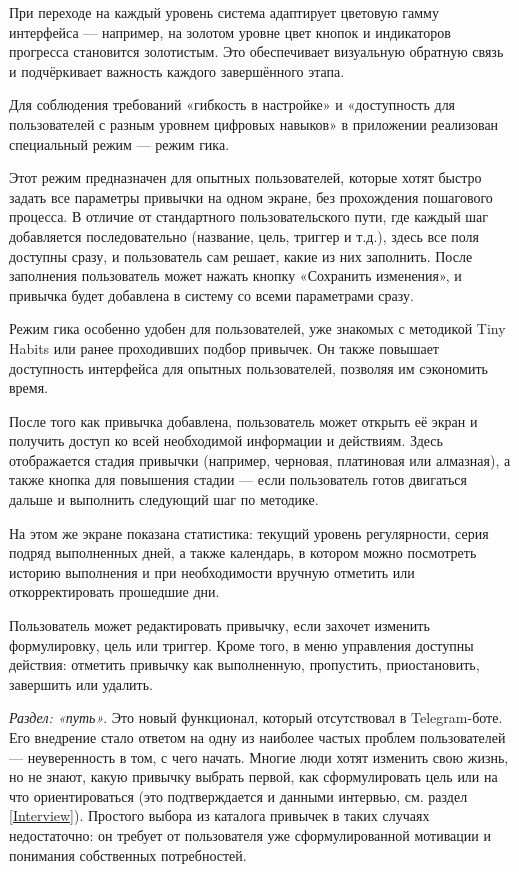 \documentclass[pdflatex,sn-mathphys-num]{sn-jnl}%
\theoremstyle{thmstyleone}%
\theoremstyle{thmstyletwo}%
\theoremstyle{thmstylethree}%
\begin{document}
При переходе на каждый уровень система адаптирует цветовую гамму интерфейса — например, на золотом уровне цвет кнопок и индикаторов прогресса становится золотистым. Это обеспечивает визуальную обратную связь и подчёркивает важность каждого завершённого этапа.

Для соблюдения требований «гибкость в настройке» и «доступность для пользователей с разным уровнем цифровых навыков» в приложении реализован специальный режим — режим гика.

Этот режим предназначен для опытных пользователей, которые хотят быстро задать все параметры привычки на одном экране, без прохождения пошагового процесса. В отличие от стандартного пользовательского пути, где каждый шаг добавляется последовательно (название, цель, триггер и т.д.), здесь все поля доступны сразу, и пользователь сам решает, какие из них заполнить. После заполнения пользователь может нажать кнопку «Сохранить изменения», и привычка будет добавлена в систему со всеми параметрами сразу. 

Режим гика особенно удобен для пользователей, уже знакомых с методикой Tiny Habits или ранее проходивших подбор привычек. Он также повышает доступность интерфейса для опытных пользователей, позволяя им сэкономить время.

После того как привычка добавлена, пользователь может открыть её экран и получить доступ ко всей необходимой информации и действиям. Здесь отображается стадия привычки (например, черновая, платиновая или алмазная), а также кнопка для повышения стадии — если пользователь готов двигаться дальше и выполнить следующий шаг по методике.

На этом же экране показана статистика: текущий уровень регулярности, серия подряд выполненных дней, а также календарь, в котором можно посмотреть историю выполнения и при необходимости вручную отметить или откорректировать прошедшие дни.

Пользователь может редактировать привычку, если захочет изменить формулировку, цель или триггер. Кроме того, в меню управления доступны действия: отметить привычку как выполненную, пропустить, приостановить, завершить или удалить.

\textit{Раздел: «путь»}. Это новый функционал, который отсутствовал в Telegram-боте. Его внедрение стало ответом на одну из наиболее частых проблем пользователей — неуверенность в том, с чего начать. Многие люди хотят изменить свою жизнь, но не знают, какую привычку выбрать первой, как сформулировать цель или на что ориентироваться (это подтверждается и данными интервью, см. раздел \ref{Interview}). Простого выбора из каталога привычек в таких случаях недостаточно: он требует от пользователя уже сформулированной мотивации и понимания собственных потребностей.
\end{document}
